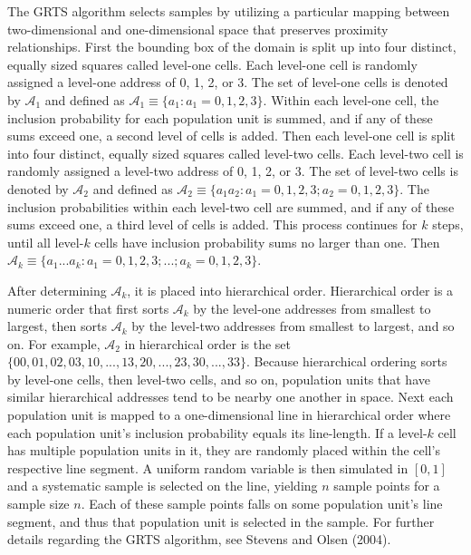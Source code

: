 \documentclass[]{elsarticle} %
\begin{document}
The GRTS algorithm selects samples by utilizing a particular mapping
between two-dimensional and one-dimensional space that preserves
proximity relationships. First the bounding box of the domain is split
up into four distinct, equally sized squares called level-one cells.
Each level-one cell is randomly assigned a level-one address of 0, 1, 2,
or 3. The set of level-one cells is denoted by \(\mathcal{A}_1\) and
defined as \(\mathcal{A}_1 \equiv \{a_1: a_1 = 0, 1, 2, 3\}\). Within
each level-one cell, the inclusion probability for each population unit
is summed, and if any of these sums exceed one, a second level of cells
is added. Then each level-one cell is split into four distinct, equally
sized squares called level-two cells. Each level-two cell is randomly
assigned a level-two address of 0, 1, 2, or 3. The set of level-two
cells is denoted by \(\mathcal{A}_2\) and defined as
\(\mathcal{A}_2 \equiv \{a_1a_2: a_1 = 0, 1, 2, 3; a_2 = 0, 1, 2, 3\}\).
The inclusion probabilities within each level-two cell are summed, and
if any of these sums exceed one, a third level of cells is added. This
process continues for \(k\) steps, until all level-\(k\) cells have
inclusion probability sums no larger than one. Then
\(\mathcal{A}_k \equiv \{a_1...a_k : a_1 = 0, 1, 2, 3; ...; a_k = 0, 1, 2, 3\}\).

After determining \(\mathcal{A}_k\), it is placed into hierarchical
order. Hierarchical order is a numeric order that first sorts
\(\mathcal{A}_k\) by the level-one addresses from smallest to largest,
then sorts \(\mathcal{A}_k\) by the level-two addresses from smallest to
largest, and so on. For example, \(\mathcal{A}_2\) in hierarchical order
is the set
\linebreak \(\{00, 01, 02, 03, 10, ..., 13, 20, ..., 23, 30, ..., 33\}\).
Because hierarchical ordering sorts by level-one cells, then level-two
cells, and so on, population units that have similar hierarchical
addresses tend to be nearby one another in space. Next each population
unit is mapped to a one-dimensional line in hierarchical order where
each population unit's inclusion probability equals its line-length. If
a level-\(k\) cell has multiple population units in it, they are
randomly placed within the cell's respective line segment. A uniform
random variable is then simulated in \([0, 1]\) and a systematic sample
is selected on the line, yielding \(n\) sample points for a sample size
\(n\). Each of these sample points falls on some population unit's line
segment, and thus that population unit is selected in the sample. For
further details regarding the GRTS algorithm, see Stevens and Olsen
(2004).
\end{document}
